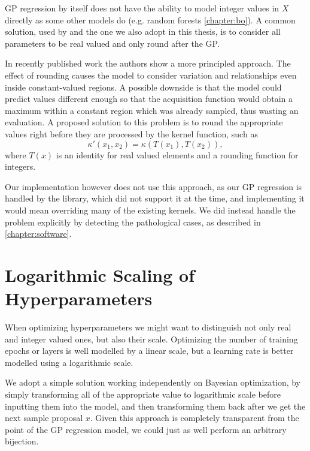 GP regression by itself does not have the ability to model integer values in $X$ directly as some other models do (e.g. random forests \autoref{chapter:bo}). A common solution, used by \citep{spearmint} and the one we also adopt in this thesis, is to consider all parameters to be real valued and only round after the GP.

In recently published work \cite{integer-valued-gp} the authors show a more principled approach. The effect of rounding causes the model to consider variation and relationships even inside constant-valued regions. A possible downside is that the model could predict values different enough so that the acquisition function would obtain a maximum within a constant region which was already sampled, thus wasting an evaluation. A proposed solution to this problem is to round the appropriate values right before they are processed by the kernel function, such as
$$\kappa'(x_1, x_2) = \kappa(T(x_1), T(x_2)),$$ where $T(x)$ is an identity for real valued elements and a rounding function for integers.

Our implementation however does not use this approach, as our GP regression is handled by the \cite{gpy2014} library, which did not support it at the time, and implementing it would mean overriding many of the existing kernels. We did instead handle the problem explicitly by detecting the pathological cases, as described in \autoref{chapter:software}.

\section{Logarithmic Scaling of Hyperparameters}

When optimizing hyperparameters we might want to distinguish not only real and integer valued ones, but also their scale. Optimizing the number of training epochs or layers is well modelled by a linear scale, but a learning rate is better modelled using a logarithmic scale.

We adopt a simple solution working independently on Bayesian optimization, by simply transforming all of the appropriate value to logarithmic scale before inputting them into the model, and then transforming them back after we get the next sample proposal $x$. Given this approach is completely transparent from the point of the GP regression model, we could just as well perform an arbitrary bijection.


